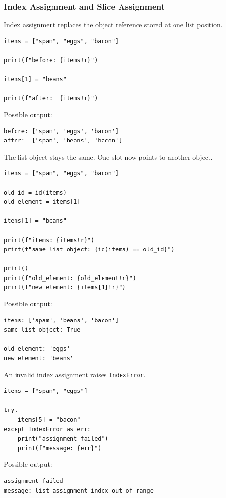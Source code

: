 \subsubsection{Index Assignment and Slice Assignment}

Index assignment replaces the object reference stored at one list position.

\begin{verbatim}
items = ["spam", "eggs", "bacon"]

print(f"before: {items!r}")

items[1] = "beans"

print(f"after:  {items!r}")
\end{verbatim}

Possible output:

\begin{verbatim}
before: ['spam', 'eggs', 'bacon']
after:  ['spam', 'beans', 'bacon']
\end{verbatim}

The list object stays the same. One slot now points to another object.

\begin{verbatim}
items = ["spam", "eggs", "bacon"]

old_id = id(items)
old_element = items[1]

items[1] = "beans"

print(f"items: {items!r}")
print(f"same list object: {id(items) == old_id}")

print()
print(f"old_element: {old_element!r}")
print(f"new element: {items[1]!r}")
\end{verbatim}

Possible output:

\begin{verbatim}
items: ['spam', 'beans', 'bacon']
same list object: True

old_element: 'eggs'
new element: 'beans'
\end{verbatim}

An invalid index assignment raises \texttt{IndexError}.

\begin{verbatim}
items = ["spam", "eggs"]

try:
    items[5] = "bacon"
except IndexError as err:
    print("assignment failed")
    print(f"message: {err}")
\end{verbatim}

Possible output:

\begin{verbatim}
assignment failed
message: list assignment index out of range
\end{verbatim}


